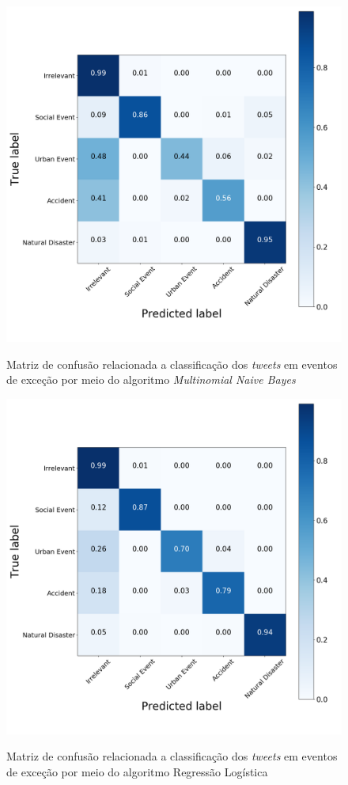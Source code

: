 \documentclass[
	12pt,				%
	oneside,			%
	a4paper,			%
	english,			%
	brazil				%
	]{abntex2ppgsi}
\begin{document}
\begin{apendicesenv}
\begin{figure}[!htb]
	\centering
 	  \caption{Matriz de confusão relacionada a classificação dos \textit{tweets} em eventos de exceção por meio do algoritmo \textit{Multinomial Naive Bayes}}
		\includegraphics[width=1\linewidth]{images/confusion_matrix_mnb.png}
	\label{fig:confusion_matrix_mnb}
\end{figure}

\begin{figure}[!htb]
	\centering
 	  \caption{Matriz de confusão relacionada a classificação dos \textit{tweets} em eventos de exceção por meio do algoritmo Regressão Logística}
		\includegraphics[width=1\linewidth]{images/confusion_matrix_lr.png}
	\label{fig:confusion_matrix_rl}
\end{figure}


\end{apendicesenv}
\end{document}
